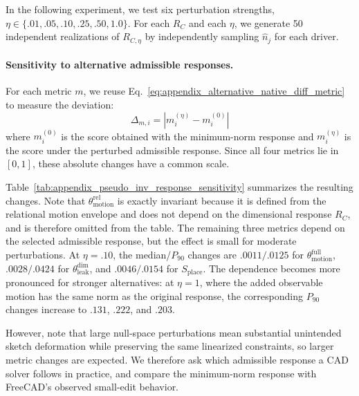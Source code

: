 In the following experiment, we test six perturbation strengths, $\eta\in\{.01,.05,.10,.25,.50,1.0\}$.
For each $R_C$ and each $\eta$, we generate 50 independent realizations of $R_{C,\eta}$ by independently sampling $\hat{n}_j$ for each driver.

\paragraph{Sensitivity to alternative admissible responses.}
For each metric $m$, we reuse Eq.~\ref{eq:appendix_alternative_native_diff_metric} to measure the deviation:
\begin{equation}
\Delta_{m,i} = |m_i^{(\eta)} - m_i^{(0)}|
\end{equation}
where $m_i^{(0)}$ is the score obtained with the minimum-norm response and $m_i^{(\eta)}$ is the score under the perturbed admissible response. Since all four metrics lie in $[0,1]$, these absolute changes have a common scale.

Table~\ref{tab:appendix_pseudo_inv_response_sensitivity} summarizes the resulting changes.
Note that $\theta_{\mathrm{motion}}^{\mathrm{rel}}$ is exactly invariant because it is defined from the relational motion envelope and does not depend on the dimensional response $R_C$, and is therefore omitted from the table.
The remaining three metrics depend on the selected admissible response, but the effect is small for moderate perturbations. At $\eta=.10$, the median/$P_{90}$ changes are $.0011/.0125$ for $\theta_{\mathrm{motion}}^{\mathrm{full}}$, $.0028/.0424$ for $\theta_{\mathrm{leak}}^{\mathrm{dim}}$, and $.0046/.0154$ for $S_{\mathrm{place}}$.
The dependence becomes more pronounced for stronger alternatives: at $\eta=1$, where the added observable motion has the same norm as the original response, the corresponding $P_{90}$ changes increase to $.131$, $.222$, and $.203$.

However, note that large null-space perturbations mean substantial unintended sketch deformation while preserving the same linearized constraints, so larger metric changes are expected. We therefore ask which admissible response a CAD solver follows in practice, and compare the minimum-norm response with FreeCAD's observed small-edit behavior.

